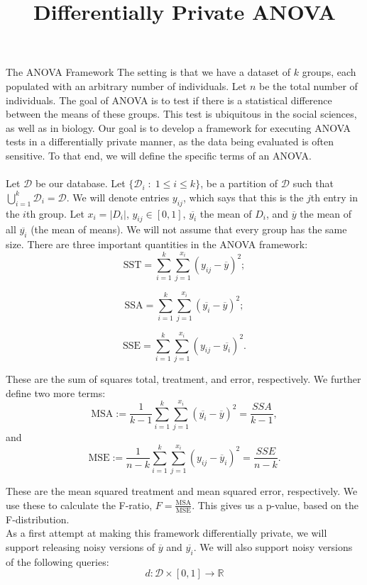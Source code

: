 \documentclass[11pt]{article}
\begin{document}
\title{Differentially Private ANOVA}

\maketitle


\begin{section}{The ANOVA Framework}
The setting is that we have a dataset of $k$ groups, each populated with 
an arbitrary number of individuals. Let $n$ be the total number of 
individuals.
The goal of ANOVA is to test if there 
is a statistical difference between the means of these groups. This test 
is ubiquitous in the social sciences, as well as in biology. Our goal is to 
develop a framework for executing ANOVA tests in a differentially 
private manner, as the data being evaluated is often sensitive. To that 
end, we will define the specific terms of an ANOVA.
\\
\\
Let $\mathcal{D}$ be our database. Let $\{\mathcal{D}_i\; : \; 1\leq i\leq 
k\}$, be a partition of $\mathcal{D}$ such that 
$\bigcup_{i=1}^k \mathcal{D}_i = \mathcal{D}$. We will denote entries 
$y_{ij}$, which says that this is the $j$th entry in the $i$th group. Let 
$x_i = |D_i|$, $y_{ij}\in [0,1]$, $\overline{y_i}$ the mean of $D_i$, and 
$\overline{y}$ the mean of all $\overline{y_i}$ (the mean of means). We will 
not assume that every group has the same size. There are three important 
quantities in the ANOVA framework:
\[
\text{SST} = \sum_{i=1}^k \sum_{j=1}^{x_i} (y_{ij} - \overline{y})^2;
\]

\[
\text{SSA} = \sum_{i=1}^{k} \sum_{j=1}^{x_i}(\overline{y_i} - \overline{y})^2;
\]

\[
\text{SSE} = \sum_{i=1}^k \sum_{j=1}^{x_i} (y_{ij} - \overline{y_i})^2.
\]

These are the sum of squares total, treatment, and error, respectively. 
We further define two more terms: 
\[
\text{MSA} := \frac{1}{k-1}\sum_{i=1}^{k} 
\sum_{j=1}^{x_i}(\overline{y_i} - \overline{y})^2 = \frac{SSA}{k-1},
\] 
and 
\[
\text{MSE} := \frac{1}{n-k} \sum_{i=1}^k \sum_{j=1}^{x_i} (y_{ij} - 
\overline{y}_i)^2 = \frac{SSE}{n-k}.
\]

These are the mean squared treatment and mean squared error, respectively. 
We use these to calculate the F-ratio, $F=\frac{\text{MSA}}{\text{MSE}}$. 
This gives us a p-value, based on the F-distribution.
\\
As a first attempt at making this framework differentially private, we will 
support releasing noisy versions of $\overline{y}$ and $\overline{y_i}$. We 
will also support noisy versions of the following queries:
\[
d:\mathcal{D}\times [0,1]\to\mathbb{R}
\]


\end{section}
\end{document}
